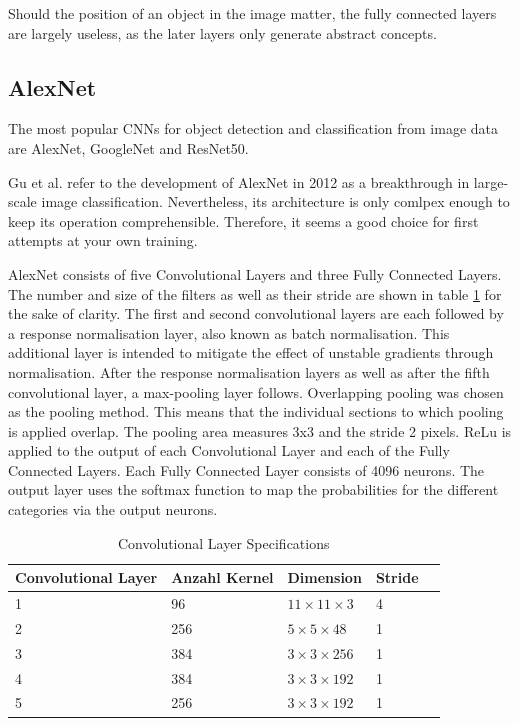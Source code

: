 Should the position of an object in the image matter, the fully connected layers are largely useless, as the later layers only generate abstract concepts. \cite{Chollet:2018}

\subsection{AlexNet}
The most popular CNNs for object detection and classification from image data are AlexNet, GoogleNet and ResNet50. \cite{Sharma:2018}

Gu et al. \cite{Gu:2018} refer to the development of AlexNet in 2012 as a breakthrough in large-scale image classification. Nevertheless, its architecture is only comlpex enough to keep its operation comprehensible. Therefore, it seems a good choice for first attempts at your own training.


AlexNet consists of five Convolutional Layers and three Fully Connected Layers. The number and size of the filters as well as their stride are shown in table \ref{ConvAlex} for the sake of clarity. The first and second convolutional layers are each followed by a response normalisation layer, also known as batch normalisation. This additional layer is intended to mitigate the effect of unstable gradients through normalisation. After the response normalisation layers as well as after the fifth convolutional layer, a max-pooling layer follows. Overlapping pooling was chosen as the pooling method. This means that the individual sections to which pooling is applied overlap. The pooling area measures 3x3 and the stride 2 pixels. ReLu is applied to the output of each Convolutional Layer and each of the Fully Connected Layers. Each Fully Connected Layer consists of 4096 neurons. The output layer uses the softmax function to map the probabilities for the different categories via the output neurons. \cite{Krizhevsky:2012,Alake:2020}



\begin{table} [H]
	\centering
	\begin{tabular} {l l l l l}
		Convolutional Layer & Anzahl Kernel & Dimension & Stride \\ \hline
		1 & 96 & $11\times11\times3$ & 4\\
		2 & 256 & $5\times5\times48$ & 1\\
		3 & 384 & $3\times3\times256$ & 1\\
		4 & 384 & $3\times3\times192$ & 1\\
		5 & 256 & $3\times3\times192$ & 1\\
	\end{tabular}
	\caption{Convolutional Layer Specifications}
	\label{ConvAlex}
\end{table}

